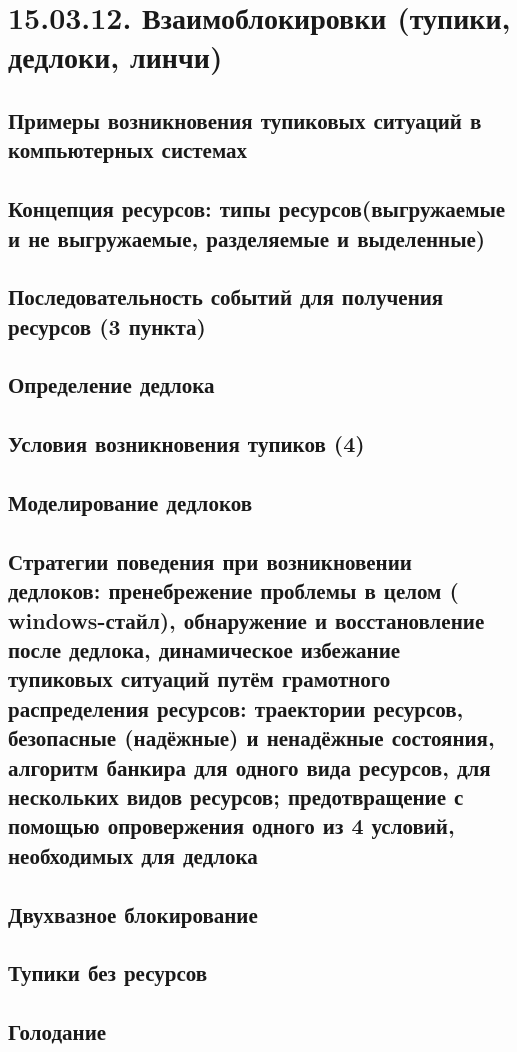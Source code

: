 \documentclass[a4paper,12pt,notitlepage,pdftex,headsepline]{scrartcl}
\begin{document}
  \section{15.03.12. Взаимоблокировки (тупики, дедлоки, линчи)}
  \subsection{Примеры возникновения тупиковых ситуаций в компьютерных системах}
  \subsection{Концепция ресурсов: типы ресурсов(выгружаемые и не выгружаемые, разделяемые и выделенные)}
  \subsection{Последовательность событий для получения ресурсов (3 пункта)}
  \subsection{Определение дедлока}
  \subsection{Условия возникновения тупиков (4)}
  \subsection{Моделирование дедлоков}
  \subsection{Стратегии поведения при возникновении дедлоков: пренебрежение проблемы в целом ( windows-стайл), обнаружение и восстановление после дедлока, динамическое избежание тупиковых ситуаций путём грамотного распределения ресурсов: траектории ресурсов, безопасные (надёжные) и ненадёжные состояния, алгоритм банкира для одного вида ресурсов, для нескольких видов ресурсов; предотвращение с помощью опровержения одного из 4 условий, необходимых для дедлока}
  \subsection{Двухвазное блокирование}
  \subsection{Тупики без ресурсов}
  \subsection{Голодание}
\end{document}
